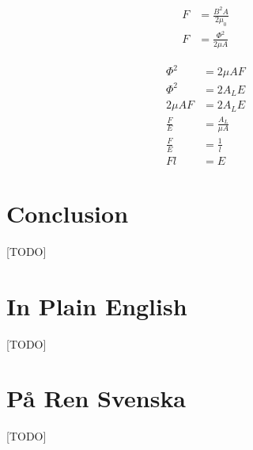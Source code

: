 \documentclass[]{../common/elementary-physics}
\begin{document}
\begin{subequations}
\begin{align}
F &= \frac{B^2 A}{2 \mu_0} \\
F &= \frac{{\Phi}^2}{2 \mu A}
\end{align}
\end{subequations}

\begin{subequations}
\begin{align}
{\Phi}^2 &= 2 \mu A F \\
{\Phi}^2 &= 2 A_L E \\
2 \mu A F &= 2 A_L E \\
\frac{F}{E} &= \frac{A_L}{\mu A} \\
\frac{F}{E} &= \frac{1}{l} \\
F l &= E
\end{align}
\end{subequations}

\section{Conclusion}

[TODO]

\appendix

\section{In Plain English}

[TODO]

\section{På Ren Svenska}

[TODO]



\printbibliography
\end{document}
